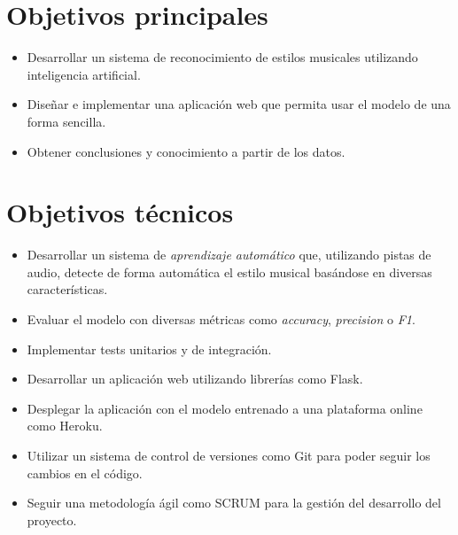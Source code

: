 \section{Objetivos principales}
\begin{itemize}
\tightlist
\item Desarrollar un sistema de reconocimiento de estilos musicales utilizando inteligencia artificial.
\item Diseñar e implementar una aplicación web que permita usar el modelo de una forma sencilla.
\item Obtener conclusiones y conocimiento a partir de los datos.
\end{itemize}

\section{Objetivos técnicos}
\begin{itemize}
\tightlist
\item Desarrollar un sistema de \textit{aprendizaje automático} que, utilizando pistas de audio, detecte de forma automática el estilo musical basándose en diversas características.
\item Evaluar el modelo con diversas métricas como \textit{accuracy}, \textit{precision} o \textit{F1}.
\item Implementar tests unitarios y de integración.
\item Desarrollar un aplicación web utilizando librerías como Flask.
\item Desplegar la aplicación con el modelo entrenado a una plataforma online como Heroku.
\item Utilizar un sistema de control de versiones como Git para poder seguir los cambios en el código.
\item Seguir una metodología ágil como SCRUM para la gestión del desarrollo del proyecto.
\end{itemize}